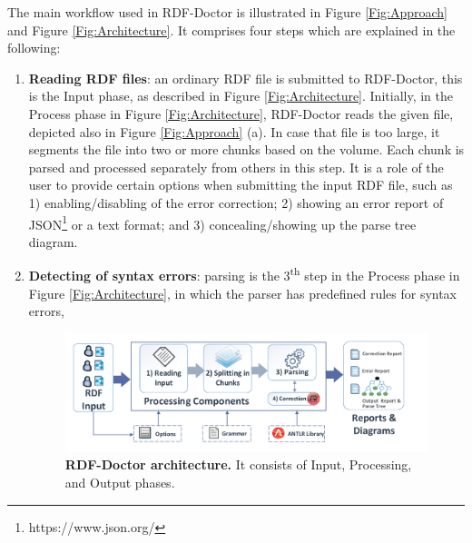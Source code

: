 The main workflow used in RDF-Doctor is illustrated in Figure \ref{Fig:Approach} and Figure \ref{Fig:Architecture}.
It comprises four steps which are explained in the following:

 \begin{enumerate}[label=(\alph*)]
\item \textbf{Reading RDF files}: an ordinary RDF file is submitted to RDF-Doctor, this is the Input phase, as described in Figure \ref{Fig:Architecture}.
Initially, in the Process phase in Figure \ref{Fig:Architecture}, RDF-Doctor reads the given file, depicted also in Figure \ref{Fig:Approach} (a). 
In case that file is too large, it segments the file into two or more chunks based on the volume. 
Each chunk is parsed and processed separately from others in this step.
It is a role of the user to provide certain options when submitting the input RDF file, such as 1) enabling/disabling of the error correction; 2) showing an error report of JSON\footnote{https://www.json.org/} or a text format; and 3) concealing/showing up the parse tree diagram.
\item \textbf{Detecting of syntax errors}: parsing is the 3\textsuperscript{th} step in  the Process phase in Figure \ref{Fig:Architecture}, in which the parser has predefined rules for syntax errors,  %
\begin{figure}[ht]
	\begin{center}
		\includegraphics[scale=0.5]{images/architecture.pdf}
	\setlength\belowcaptionskip{-5mm}
		\setlength\abovecaptionskip{-2mm}		\caption{\textbf{RDF-Doctor architecture.} It consists of Input, Processing, and Output phases. 
}
\end{center}
\end{figure}
\end{enumerate}
